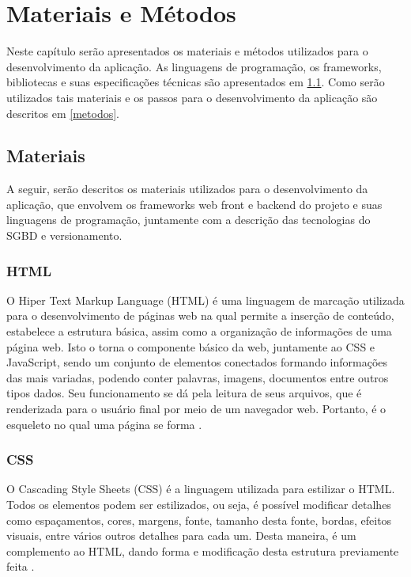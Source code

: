 \chapter{Materiais e Métodos}\label{chp:LABEL_CHP_3}
Neste capítulo serão apresentados os materiais e métodos utilizados para o desenvolvimento da aplicação. As linguagens de programação, os frameworks, bibliotecas e suas especificações técnicas são apresentados em \ref{materiais}. Como serão utilizados tais materiais e os passos para o desenvolvimento da aplicação são descritos em \ref{metodos}.

\section{Materiais} \label{materiais}
A seguir, serão descritos os materiais utilizados para o desenvolvimento da aplicação, que envolvem os frameworks web front e backend do projeto e suas linguagens de programação, juntamente com a descrição das tecnologias do SGBD e versionamento.

\subsection{HTML}
O Hiper Text Markup Language (HTML) é uma linguagem de marcação utilizada para o desenvolvimento de páginas web na qual permite a inserção de conteúdo, estabelece a estrutura básica, assim como a organização de informações de uma página web. Isto o torna o componente básico da web, juntamente ao CSS e JavaScript, sendo um conjunto de elementos conectados formando informações das mais variadas, podendo conter palavras, imagens, documentos entre outros tipos dados. Seu funcionamento se dá pela leitura de seus arquivos, que é renderizada para o usuário final por meio de um navegador web. Portanto, é o esqueleto no qual uma página se forma \cite{FLANAGAN}.

\subsection{CSS}
O Cascading Style Sheets (CSS) é a linguagem utilizada para estilizar o HTML. Todos os elementos podem ser estilizados, ou seja, é possível modificar detalhes como espaçamentos, cores, margens, fonte, tamanho desta fonte, bordas, efeitos visuais, entre vários outros detalhes para cada um. Desta maneira, é um complemento ao HTML, dando forma e modificação desta estrutura previamente feita \cite{FLANAGAN}.

